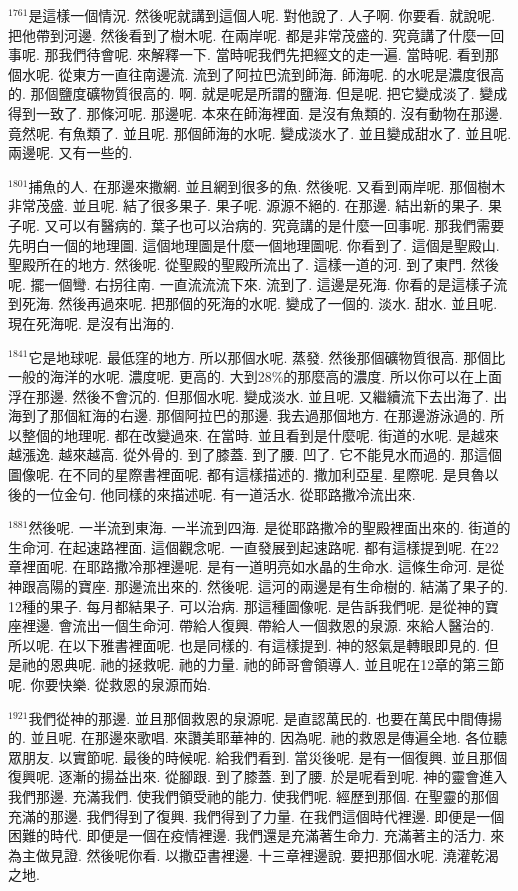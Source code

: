\documentclass{book}
\begin{document}
$^{1761}$是這樣一個情況.
然後呢就講到這個人呢.
對他說了.
人子啊.
你要看.
就說呢.
把他帶到河邊.
然後看到了樹木呢.
在兩岸呢.
都是非常茂盛的.
究竟講了什麼一回事呢.
那我們待會呢.
來解釋一下.
當時呢我們先把經文的走一遍.
當時呢.
看到那個水呢.
從東方一直往南邊流.
流到了阿拉巴流到師海.
師海呢.
的水呢是濃度很高的.
那個鹽度礦物質很高的.
啊.
就是呢是所謂的鹽海.
但是呢.
把它變成淡了.
變成得到一致了.
那條河呢.
那邊呢.
本來在師海裡面.
是沒有魚類的.
沒有動物在那邊.
竟然呢.
有魚類了.
並且呢.
那個師海的水呢.
變成淡水了.
並且變成甜水了.
並且呢.
兩邊呢.
又有一些的.

$^{1801}$捕魚的人.
在那邊來撒網.
並且網到很多的魚.
然後呢.
又看到兩岸呢.
那個樹木非常茂盛.
並且呢.
結了很多果子.
果子呢.
源源不絕的.
在那邊.
結出新的果子.
果子呢.
又可以有醫病的.
葉子也可以治病的.
究竟講的是什麼一回事呢.
那我們需要先明白一個的地理圖.
這個地理圖是什麼一個地理圖呢.
你看到了.
這個是聖殿山.
聖殿所在的地方.
然後呢.
從聖殿的聖殿所流出了.
這樣一道的河.
到了東門.
然後呢.
擺一個彎.
右拐往南.
一直流流流下來.
流到了.
這邊是死海.
你看的是這樣子流到死海.
然後再過來呢.
把那個的死海的水呢.
變成了一個的.
淡水.
甜水.
並且呢.
現在死海呢.
是沒有出海的.

$^{1841}$它是地球呢.
最低窪的地方.
所以那個水呢.
蒸發.
然後那個礦物質很高.
那個比一般的海洋的水呢.
濃度呢.
更高的.
大到28\%的那麼高的濃度.
所以你可以在上面浮在那邊.
然後不會沉的.
但那個水呢.
變成淡水.
並且呢.
又繼續流下去出海了.
出海到了那個紅海的右邊.
那個阿拉巴的那邊.
我去過那個地方.
在那邊游泳過的.
所以整個的地理呢.
都在改變過來.
在當時.
並且看到是什麼呢.
街道的水呢.
是越來越漲逸.
越來越高.
從外骨的.
到了膝蓋.
到了腰.
凹了.
它不能見水而過的.
那這個圖像呢.
在不同的星際書裡面呢.
都有這樣描述的.
撒加利亞星.
星際呢.
是貝魯以後的一位金句.
他同樣的來描述呢.
有一道活水.
從耶路撒冷流出來.

$^{1881}$然後呢.
一半流到東海.
一半流到四海.
是從耶路撒冷的聖殿裡面出來的.
街道的生命河.
在起速路裡面.
這個觀念呢.
一直發展到起速路呢.
都有這樣提到呢.
在22章裡面呢.
在耶路撒冷那裡邊呢.
是有一道明亮如水晶的生命水.
這條生命河.
是從神跟高陽的寶座.
那邊流出來的.
然後呢.
這河的兩邊是有生命樹的.
結滿了果子的.
12種的果子.
每月都結果子.
可以治病.
那這種圖像呢.
是告訴我們呢.
是從神的寶座裡邊.
會流出一個生命河.
帶給人復興.
帶給人一個救恩的泉源.
來給人醫治的.
所以呢.
在以下雅書裡面呢.
也是同樣的.
有這樣提到.
神的怒氣是轉眼即見的.
但是祂的恩典呢.
祂的拯救呢.
祂的力量.
祂的師哥會領導人.
並且呢在12章的第三節呢.
你要快樂.
從救恩的泉源而始.

$^{1921}$我們從神的那邊.
並且那個救恩的泉源呢.
是直認萬民的.
也要在萬民中間傳揚的.
並且呢.
在那邊來歌唱.
來讚美耶華神的.
因為呢.
祂的救恩是傳遍全地.
各位聽眾朋友.
以實節呢.
最後的時候呢.
給我們看到.
當災後呢.
是有一個復興.
並且那個復興呢.
逐漸的揚益出來.
從腳跟.
到了膝蓋.
到了腰.
於是呢看到呢.
神的靈會進入我們那邊.
充滿我們.
使我們領受祂的能力.
使我們呢.
經歷到那個.
在聖靈的那個充滿的那邊.
我們得到了復興.
我們得到了力量.
在我們這個時代裡邊.
即便是一個困難的時代.
即便是一個在疫情裡邊.
我們還是充滿著生命力.
充滿著主的活力.
來為主做見證.
然後呢你看.
以撒亞書裡邊.
十三章裡邊說.
要把那個水呢.
澆灌乾渴之地.
\end{document}
